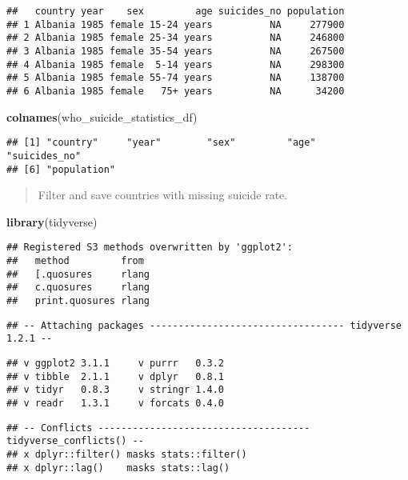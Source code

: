 \documentclass[]{article}
\newenvironment{Shaded}{\begin{snugshade}}{\end{snugshade}}
\newcommand{\KeywordTok}[1]{\textcolor[rgb]{0.13,0.29,0.53}{\textbf{#1}}}
\newcommand{\NormalTok}[1]{#1}
\begin{document}
\begin{verbatim}
##   country year    sex         age suicides_no population
## 1 Albania 1985 female 15-24 years          NA     277900
## 2 Albania 1985 female 25-34 years          NA     246800
## 3 Albania 1985 female 35-54 years          NA     267500
## 4 Albania 1985 female  5-14 years          NA     298300
## 5 Albania 1985 female 55-74 years          NA     138700
## 6 Albania 1985 female   75+ years          NA      34200
\end{verbatim}

\begin{Shaded}
\begin{Highlighting}[]
\KeywordTok{colnames}\NormalTok{(who_suicide_statistics_df)}
\end{Highlighting}
\end{Shaded}

\begin{verbatim}
## [1] "country"     "year"        "sex"         "age"         "suicides_no"
## [6] "population"
\end{verbatim}

\begin{quote}
Filter and save countries with missing suicide rate.
\end{quote}

\begin{Shaded}
\begin{Highlighting}[]
\KeywordTok{library}\NormalTok{(tidyverse)}
\end{Highlighting}
\end{Shaded}

\begin{verbatim}
## Registered S3 methods overwritten by 'ggplot2':
##   method         from 
##   [.quosures     rlang
##   c.quosures     rlang
##   print.quosures rlang
\end{verbatim}

\begin{verbatim}
## -- Attaching packages ---------------------------------- tidyverse 1.2.1 --
\end{verbatim}

\begin{verbatim}
## v ggplot2 3.1.1     v purrr   0.3.2
## v tibble  2.1.1     v dplyr   0.8.1
## v tidyr   0.8.3     v stringr 1.4.0
## v readr   1.3.1     v forcats 0.4.0
\end{verbatim}

\begin{verbatim}
## -- Conflicts ------------------------------------- tidyverse_conflicts() --
## x dplyr::filter() masks stats::filter()
## x dplyr::lag()    masks stats::lag()
\end{verbatim}
\end{document}
